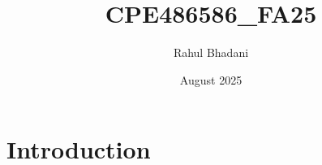 \documentclass{article}
\title{CPE486586_FA25}
\author{Rahul Bhadani}
\date{August 2025}
\begin{document}
\maketitle

\section{Introduction}
\end{document}
